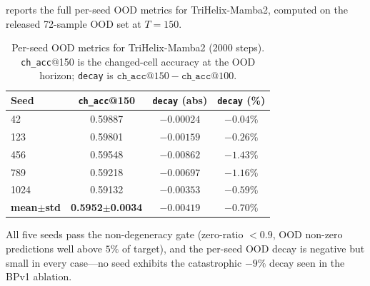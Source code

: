  reports the full per-seed OOD metrics for TriHelix-Mamba2,
computed on the released 72-sample OOD set at $T{=}150$.

\begin{table}[h]
\centering
\small
\caption{Per-seed OOD metrics for TriHelix-Mamba2 (2000 steps).
\texttt{ch\_acc}@150 is the changed-cell accuracy at the OOD horizon;
\texttt{decay} is $\texttt{ch\_acc}@150 - \texttt{ch\_acc}@100$.}
\label{tab:seed}
\begin{tabular}{lccc}
\toprule
Seed & \texttt{ch\_acc}@150 & \texttt{decay} (abs) & \texttt{decay} (\%) \\
\midrule
42   & 0.59887 & $-0.00024$ & $-0.04\%$ \\
123  & 0.59801 & $-0.00159$ & $-0.26\%$ \\
456  & 0.59548 & $-0.00862$ & $-1.43\%$ \\
789  & 0.59218 & $-0.00697$ & $-1.16\%$ \\
1024 & 0.59132 & $-0.00353$ & $-0.59\%$ \\
\midrule
\textbf{mean$\pm$std} & \textbf{0.5952$\pm$0.0034} & \textbf{$-0.00419$} & \textbf{$-0.70\%$} \\
\bottomrule
\end{tabular}
\end{table}

All five seeds pass the non-degeneracy gate (zero-ratio $<0.9$, OOD non-zero
predictions well above $5\%$ of target), and the per-seed OOD decay is negative
but small in every case---no seed exhibits the catastrophic $-9\%$ decay seen
in the BPv1 ablation.
